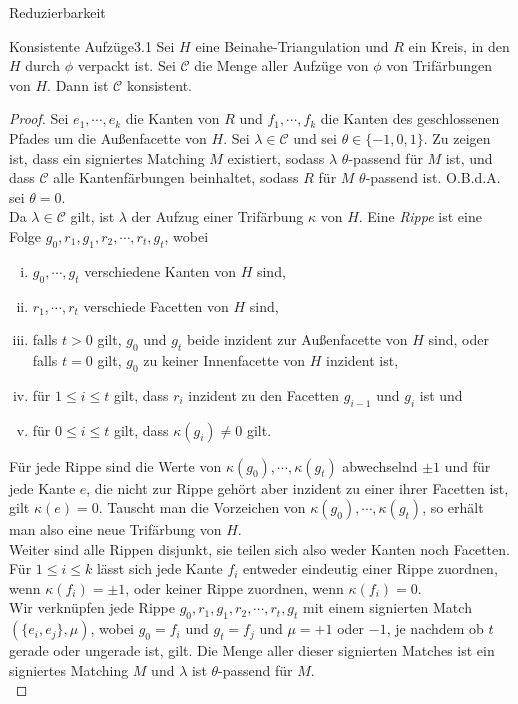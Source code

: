 \begin{section}{Reduzierbarkeit}
 \begin{satzl}{Konsistente Aufzüge}{3.1}
  Sei $H$ eine Beinahe-Triangulation und $R$ ein Kreis, in den $H$ durch $\phi$ verpackt ist. Sei $\mathscr{C}$ die Menge aller Aufzüge von $\phi$ von Trifärbungen von $H$. Dann ist $\mathscr{C}$ konsistent.
 \end{satzl}
 \begin{proof}
  Sei $e_1,\cdots,e_k$ die Kanten von $R$ und $f_1,\cdots,f_k$ die Kanten des geschlossenen Pfades um die Außenfacette von $H$. Sei $\lambda \in \mathscr{C}$ und sei $\theta \in \{-1,0,1\}$. Zu zeigen ist, dass ein signiertes Matching $M$ existiert, sodass $\lambda$ $\theta$-passend für $M$ ist, und dass $\mathscr{C}$ alle Kantenfärbungen beinhaltet, sodass $R$ für $M$ $\theta$-passend ist. O.B.d.A. sei $\theta = 0$.\\
  Da $\lambda \in \mathscr{C}$ gilt, ist $\lambda$ der Aufzug einer Trifärbung $\kappa$ von $H$. Eine \textit{Rippe} ist eine Folge $g_0,r_1,g_1,r_2,\cdots,r_t,g_t$, wobei
  \begin{enumerate}[(i)]
   \item $g_0,\cdots,g_t$ verschiedene Kanten von $H$ sind,
   \item $r_1,\cdots,r_t$ verschiede Facetten von $H$ sind,
   \item falls $t >0$ gilt, $g_0$ und $g_t$ beide inzident zur Außenfacette von $H$ sind, oder falls $t=0$ gilt, $g_0$ zu keiner Innenfacette von $H$ inzident ist,
   \item für $1\leq i\leq t$ gilt, dass $r_i$ inzident zu den Facetten $g_{i-1}$ und $g_i$ ist und
   \item für $0\leq i\leq t$ gilt, dass $\kappa(g_i) \neq 0$ gilt.
  \end{enumerate}
  Für jede Rippe sind die Werte von $\kappa(g_0),\cdots,\kappa(g_t)$ abwechselnd $\pm 1$ und für jede Kante $e$, die nicht zur Rippe gehört aber inzident zu einer ihrer Facetten ist, gilt $\kappa(e) = 0$. Tauscht man die Vorzeichen von $\kappa(g_0),\cdots,\kappa(g_t)$, so erhält man also eine neue Trifärbung von $H$.\\
  Weiter sind alle Rippen disjunkt, sie teilen sich also weder Kanten noch Facetten. Für $1 \leq i \leq k$ lässt sich jede Kante $f_i$ entweder eindeutig einer Rippe zuordnen, wenn $\kappa(f_i) = \pm 1$, oder keiner Rippe zuordnen, wenn $\kappa(f_i)=0$.\\
  Wir verknüpfen jede Rippe $g_0,r_1,g_1,r_2,\cdots,r_t,g_t$ mit einem signierten Match $(\{e_i,e_j\},\mu)$, wobei $g_0 = f_i$ und $g_t = f_j$ und $\mu = +1$ oder $-1$, je nachdem ob $t$ gerade oder ungerade ist, gilt. Die Menge aller dieser signierten Matches ist ein signiertes Matching $M$ und $\lambda$ ist $\theta$-passend für $M$.\\

\end{proof}
\end{section}
